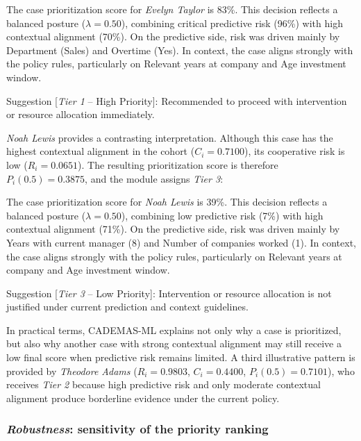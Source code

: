 \documentclass{interact}
\renewenvironment{quote}{%
  \begin{mdframed}[style=quotebox]%
}{%
  \end{mdframed}%
}
\begin{document}
\begin{quote} 
\small
The case prioritization score for \textit{Evelyn Taylor} is 83\%. This decision reflects a balanced posture ($\lambda=0.50$), combining critical predictive risk (96\%) with high contextual alignment (70\%). On the predictive side, risk was driven mainly by Department (Sales) and Overtime (Yes). In context, the case aligns strongly with the policy rules, particularly on Relevant years at company and Age investment window.

Suggestion [\textit{Tier 1} -- High Priority]: Recommended to proceed with intervention or resource allocation immediately.
\end{quote} 

\textit{Noah Lewis} provides a contrasting interpretation. Although this case has the highest contextual alignment in the cohort ($C_i=0.7100$), its cooperative risk is low ($R_i=0.0651$). The resulting prioritization score is therefore $P_i(0.5)=0.3875$, and the module assigns \textit{Tier 3}:

\begin{quote}
\small
The case prioritization score for \textit{Noah Lewis} is 39\%. This decision reflects a balanced posture ($\lambda=0.50$), combining low predictive risk (7\%) with high contextual alignment (71\%). On the predictive side, risk was driven mainly by Years with current manager (8) and Number of companies worked (1). In context, the case aligns strongly with the policy rules, particularly on Relevant years at company and Age investment window.

Suggestion [\textit{Tier 3} -- Low Priority]: Intervention or resource allocation is not justified under current prediction and context guidelines.
\end{quote}

In practical terms, CADEMAS-ML explains not only why a case is prioritized, but also why another case with strong contextual alignment may still receive a low final score when predictive risk remains limited. A third illustrative pattern is provided by \textit{Theodore Adams} ($R_i=0.9803$, $C_i=0.4400$, $P_i(0.5)=0.7101$), who receives \textit{Tier 2} because high predictive risk and only moderate contextual alignment produce borderline evidence under the current policy.

\subsubsection{\textit{Robustness}: sensitivity of the priority ranking}
\end{document}

